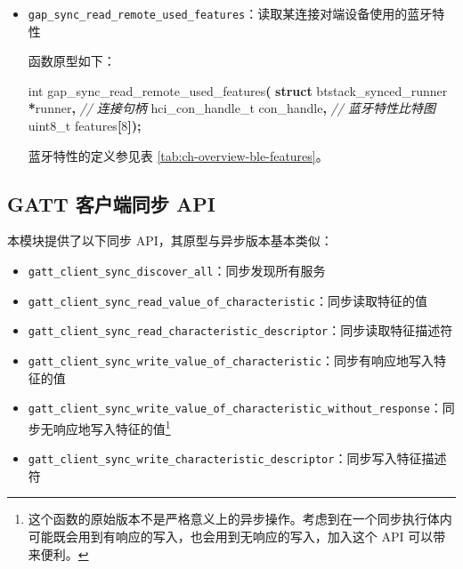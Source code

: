 \documentclass[
  12pt,
]{book}
\newenvironment{Shaded}{\begin{snugshade}}{\end{snugshade}}
\newcommand{\CommentTok}[1]{\textcolor[rgb]{0.56,0.35,0.01}{\textit{#1}}}
\newcommand{\DataTypeTok}[1]{\textcolor[rgb]{0.13,0.29,0.53}{#1}}
\newcommand{\DecValTok}[1]{\textcolor[rgb]{0.00,0.00,0.81}{#1}}
\newcommand{\KeywordTok}[1]{\textcolor[rgb]{0.13,0.29,0.53}{\textbf{#1}}}
\newcommand{\NormalTok}[1]{#1}
\newcommand{\OperatorTok}[1]{\textcolor[rgb]{0.81,0.36,0.00}{\textbf{#1}}}
\begin{document}
\begin{itemize}
  蓝牙链路层协议版本号由 Bluethooth SIG 指定，部分编号与版本号的对应关系如表
  \ref{tab:ch-overview-ble-version} 所示；
  厂家编号由厂家申请、Bluethooth SIG 指定\footnote{\url{https://www.bluetooth.com/specifications/assigned-numbers/}}；
  Controller 版本号由 Controller 厂家自行指定。
\item
  \texttt{gap\_sync\_read\_remote\_used\_features}：读取某连接对端设备使用的蓝牙特性

  函数原型如下：

\begin{Shaded}
\begin{Highlighting}[]
\DataTypeTok{int}\NormalTok{ gap\_sync\_read\_remote\_used\_features}\OperatorTok{(}
  \KeywordTok{struct}\NormalTok{ btstack\_synced\_runner }\OperatorTok{*}\NormalTok{runner}\OperatorTok{,}
  \CommentTok{// 连接句柄}
\NormalTok{  hci\_con\_handle\_t con\_handle}\OperatorTok{,}
  \CommentTok{// 蓝牙特性比特图}
  \DataTypeTok{uint8\_t}\NormalTok{ features}\OperatorTok{[}\DecValTok{8}\OperatorTok{]);}
\end{Highlighting}
\end{Shaded}

  蓝牙特性的定义参见表 \ref{tab:ch-overview-ble-features}。
\end{itemize}

\hypertarget{gatt-ux5ba2ux6237ux7aefux540cux6b65-api}{%
\subsection{GATT 客户端同步 API}\label{gatt-ux5ba2ux6237ux7aefux540cux6b65-api}}

本模块提供了以下同步 API，其原型与异步版本基本类似：

\begin{itemize}
\item
  \texttt{gatt\_client\_sync\_discover\_all}：同步发现所有服务
\item
  \texttt{gatt\_client\_sync\_read\_value\_of\_characteristic}：同步读取特征的值
\item
  \texttt{gatt\_client\_sync\_read\_characteristic\_descriptor}：同步读取特征描述符
\item
  \texttt{gatt\_client\_sync\_write\_value\_of\_characteristic}：同步有响应地写入特征的值
\item
  \texttt{gatt\_client\_sync\_write\_value\_of\_characteristic\_without\_response}：同步无响应地写入特征的值\footnote{这个函数的原始版本不是严格意义上的异步操作。考虑到在一个同步执行体内可能既会用到有响应的写入，也会用到无响应的写入，加入这个 API 可以带来便利。}
\item
  \texttt{gatt\_client\_sync\_write\_characteristic\_descriptor}：同步写入特征描述符
\end{itemize}
\end{document}
